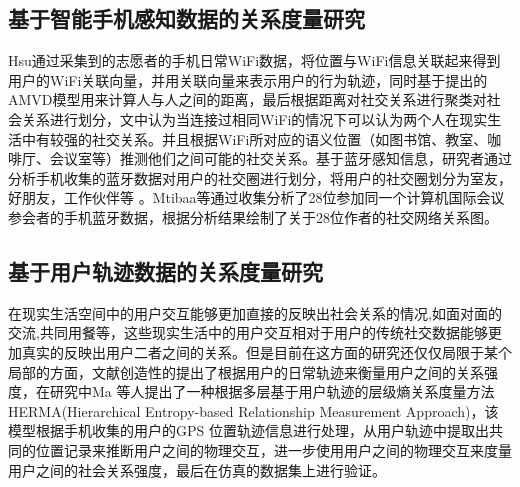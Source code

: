 \subsection{基于智能手机感知数据的关系度量研究}
Hsu通过采集到的志愿者的手机日常WiFi数据，将位置与WiFi信息关联起来得到用户的WiFi关联向量，并用关联向量来表示用户的行为轨迹，同时基于提出的AMVD模型用来计算人与人之间的距离，最后根据距离对社交关系进行聚类对社会关系进行划分，文中认为当连接过相同WiFi的情况下可以认为两个人在现实生活中有较强的社交关系。并且根据WiFi所对应的语义位置（如图书馆、教室、咖啡厅、会议室等）推测他们之间可能的社交关系。基于蓝牙感知信息，研究者通过分析手机收集的蓝牙数据对用户的社交圈进行划分，将用户的社交圈划分为室友，好朋友，工作伙伴等
。Mtibaa等通过收集分析了28位参加同一个计算机国际会议参会者的手机蓝牙数据，根据分析结果绘制了关于28位作者的社交网络关系图。
\subsection{基于用户轨迹数据的关系度量研究}
在现实生活空间中的用户交互能够更加直接的反映出社会关系的情况,如面对面的交流,共同用餐等，这些现实生活中的用户交互相对于用户的传统社交数据能够更加真实的反映出用户二者之间的关系。但是目前在这方面的研究还仅仅局限于某个局部的方面，文献\cite{ma2014effective}创造性的提出了根据用户的日常轨迹来衡量用户之间的关系强度，在研究中Ma 等人提出了一种根据多层基于用户轨迹的层级熵关系度量方法HERMA(Hierarchical Entropy-based Relationship Measurement Approach)，该模型根据手机收集的用户的GPS 位置轨迹信息进行处理，从用户轨迹中提取出共同的位置记录来推断用户之间的物理交互，进一步使用用户之间的物理交互来度量用户之间的社会关系强度，最后在仿真的数据集上进行验证。



